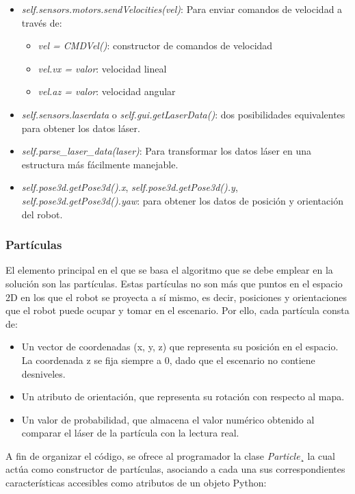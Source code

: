 \begin{itemize}
	\item \textit{self.sensors.motors.sendVelocities(vel)}: Para enviar comandos de velocidad a través de:
    \begin{itemize}[label={$\diamond$}]
			\item \textit{vel = CMDVel()}: constructor de comandos de velocidad
       \item \textit{vel.vx = valor}: velocidad lineal
       \item \textit{vel.az = valor}: velocidad angular
    \end{itemize}
    \item \textit{self.sensors.laserdata} o \textit{self.gui.getLaserData()}: dos posibilidades equivalentes para obtener los datos láser.
    \item \textit{self.parse\_laser\_data(laser)}: Para transformar los datos láser en una estructura más fácilmente manejable.
		\item \textit{self.pose3d.getPose3d().x}, \textit{self.pose3d.getPose3d().y}, \textit{self.pose3d.getPose3d().yaw}: para obtener los datos de posición y orientación del robot.
\end{itemize} 

\subsubsection{Partículas}
El elemento principal en el que se basa el algoritmo que se debe emplear en la solución son las partículas. Estas partículas no son más que puntos en el espacio 2D en los que el robot se proyecta a sí mismo, es decir, posiciones y orientaciones que el robot puede ocupar y tomar en el escenario. Por ello, cada partícula consta de:

\begin{itemize}
  \renewcommand{\labelitemi}{$\to$}
	\item Un vector de coordenadas (x, y, z) que representa su posición en el espacio. La coordenada z se fija siempre a 0, dado que el escenario no contiene desniveles.
	\item Un atributo de orientación, que representa su rotación con respecto al mapa. 
	\item Un valor de probabilidad, que almacena el valor numérico obtenido al comparar el láser de la partícula con la lectura real.
\end{itemize}

A fin de organizar el código, se ofrece al programador la clase \textit{Particle}¸ la cual actúa como constructor de partículas, asociando a cada una sus correspondientes características accesibles como atributos de un objeto Python:

